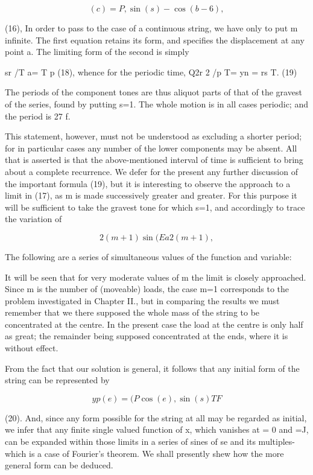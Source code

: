 \[(c) =P, \sin(s) - \cos(b-6),\]

(16), In order to pass to the case of a continuous string, we have only to put
m infinite. The first equation retains its form, and specifies the displacement
at any point a. The limiting form of the second is simply

sr /T a= T p (18), whence for the periodic time, Q2r 2 /p T= yn = rs T.  (19)

The periods of the component tones are thus aliquot parts of that of the
gravest of the series, found by putting s=1. The whole motion is in all cases
periodic; and the period is 27 f.

This statement, however, must not be understood as excluding a shorter period;
for in particular cases any number of the lower components may be absent. All
that is asserted is that the above-mentioned interval of time is sufficient to
bring about a complete recurrence. We defer for the present any further
discussion of the important formula (19), but it is interesting to observe the
approach to a limit in (17), as m is made successively greater and greater. For
this purpose it will be sufficient to take the gravest tone for which s=1, and
accordingly to trace the variation of

\[2(m+1) \sin(Ea 2 (m+ 1) ,\]

The following are a series of simultaneous values of the function and variable:

It will be seen that for very moderate values of m the limit is closely
approached. Since m is the number of (moveable) loads, the case m=1 corresponds
to the problem investigated in Chapter II., but in comparing the results we
must remember that we there supposed the whole mass of the string to be
concentrated at the centre. In the present case the load at the centre is only
half as great; the remainder being supposed concentrated at the ends, where it
is without effect.

From the fact that our solution is general, it follows that any initial form of
the string can be represented by

\[yp (e)=  (P \cos(e), \sin(s) TF\]

(20). And, since any form possible for the string at all may be regarded as
initial, we infer that any finite single valued function of x, which vanishes
at = 0 and =J, can be expanded within those limits in a series of sines of se
and its multiples-which is a case of Fourier's theorem. We shall presently shew
how the more general form can be deduced.

